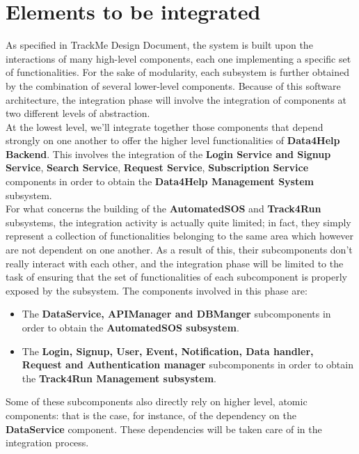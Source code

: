 \documentclass[a4paper, hidelinks, 12pt]{report}
\begin{document}
	\section{Elements to be integrated}
	As specified in TrackMe Design Document, the system is built upon the interactions of many high-level components, each one implementing a specific set of functionalities. For the sake of modularity, each subsystem is further obtained by the combination of several lower-level components. Because of this software architecture, the integration phase will involve the integration of components at two different levels of abstraction.\\

	At the lowest level, we'll integrate together those components that depend strongly on one another to offer the higher level functionalities of \textbf{Data4Help Backend}. This involves the integration of the \textbf{Login Service and Signup Service}, \textbf{Search Service}, \textbf{Request Service}, \textbf{Subscription Service} components in order to obtain the \textbf{Data4Help Management System} subsystem.\\

	For what concerns the building of the \textbf{AutomatedSOS} and \textbf{Track4Run} subsystems, the integration activity is actually quite limited; in fact, they simply represent a collection of functionalities belonging to the same area which however are not dependent on one another. As a result of this, their subcomponents don't really interact with each other, and the integration phase will be limited to the task of ensuring that the set of functionalities of each subcomponent is properly exposed by the subsystem. The components involved in this phase are:

	\begin{itemize}
	\item{} The \textbf{DataService, APIManager and DBManger} subcomponents in order to obtain the \textbf{AutomatedSOS subsystem}.
	\item{} The \textbf{Login, Signup, User, Event, Notification, Data handler, Request and  Authentication manager} subcomponents in order to obtain the \textbf{Track4Run Management subsystem}.
	\end{itemize}
		Some of these subcomponents also directly rely on higher level, atomic components: that is the case, for instance, of the dependency on the \textbf{DataService} component. These dependencies will be taken care of in the integration process.\\
\end{document}

